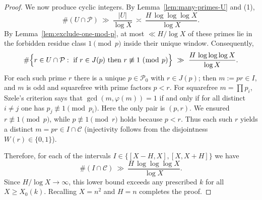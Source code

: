 \begin{proof}
We now produce cyclic integers. By Lemma~\ref{lem:many-primes-U} and (1),
$$
\#(U\cap\mathcal P)\ \gg\ \frac{|U|}{\log X}\ \asymp\ \frac{H\,\log\log\log X}{\log X}.
$$
By Lemma~\ref{lem:exclude-one-mod-p}, at most $\ll H/\log X$ of these primes lie in the forbidden residue class $1\pmod p$ inside their unique window. Consequently,
$$
\#\Bigl\{r\in U\cap\mathcal P:\ \text{if }r\in J(p)\text{ then }r\not\equiv1\ (\bmod\ p)\Bigr\}
\ \gg\ \frac{H\,\log\log\log X}{\log X}.
$$
For each such prime $r$ there is a unique $p\in\mathcal P_0$ with $r\in J(p)$; then $m:=pr\in I$, and $m$ is odd and squarefree with prime factors $p<r$. For squarefree $m=\prod p_i$, Szele's criterion \cite{Szele1947} says that $\gcd(m,\varphi(m))=1$ if and only if for all distinct $i\ne j$ one has $p_j\not\equiv1\pmod{p_i}$. Here the only pair is $(p,r)$. We ensured $r\not\equiv1\pmod p$, while $p\not\equiv1\pmod r$ holds because $p<r$. Thus each such $r$ yields a distinct $m=pr\in I\cap\mathcal C$ (injectivity follows from the disjointness $W(r)\in\{0,1\}$).

Therefore, for each of the intervals $I\in\{[X-H,X],[X,X+H]\}$ we have
$$
\#(I\cap\mathcal C)\ \gg\ \frac{H\,\log\log\log X}{\log X}.
$$
Since $H/\log X\to\infty$, this lower bound exceeds any prescribed $k$ for all $X\ge X_0(k)$. Recalling $X=n^2$ and $H=n$ completes the proof.
\end{proof}
